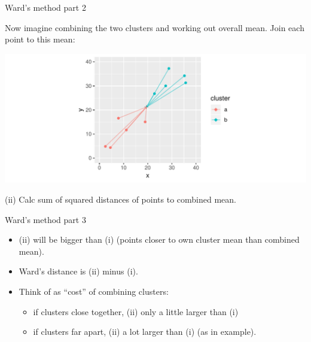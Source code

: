 \begin{frame}[fragile]{Ward's method part 2}
  
Now imagine combining the two clusters and working out overall
mean. Join each point to this mean:

\begin{knitrout}
\color{fgcolor}
\includegraphics[width=\maxwidth]{figure/unnamed-chunk-6-1} 

\end{knitrout}
(ii) Calc sum of squared distances of points to combined mean.
  
\end{frame}

\begin{frame}[fragile]{Ward's method part 3}
  
  \begin{itemize}
  \item (ii) will be bigger than (i) (points closer to own cluster
    mean than combined mean).
  \item Ward's distance is (ii) minus (i).
  \item Think of as ``cost'' of combining clusters:
    \begin{itemize}
    \item if clusters close together, (ii) only a little larger than
      (i)
    \item if clusters far apart, (ii) a lot larger than (i) (as in
      example). 
    \end{itemize}
  \end{itemize}
  
\end{frame}

